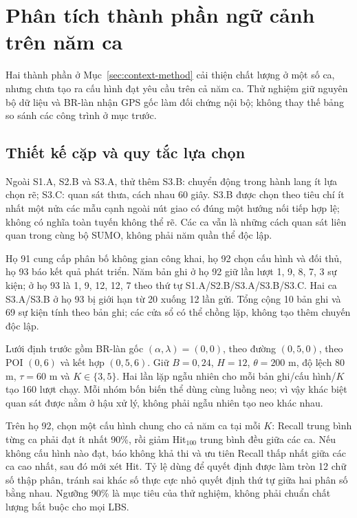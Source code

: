 \section{Phân tích thành phần ngữ cảnh trên năm ca}
\label{sec:context-study}

Hai thành phần ở Mục~\ref{sec:context-method} cải thiện chất lượng ở một số ca, nhưng chưa tạo ra cấu hình đạt yêu cầu trên cả năm ca. Thử nghiệm giữ nguyên bộ dữ liệu và BR-làn nhận GPS gốc làm đối chứng nội bộ; không thay thế bảng so sánh các công trình ở mục trước.

\subsection{Thiết kế cặp và quy tắc lựa chọn}

Ngoài S1.A, S2.B và S3.A, thử thêm S3.B: chuyển động trong hành lang ít lựa chọn rẽ; S3.C: quan sát thưa, cách nhau 60 giây. S3.B được chọn theo tiêu chí ít nhất một nửa các mẫu cạnh ngoài nút giao có đúng một hướng nối tiếp hợp lệ; không có nghĩa toàn tuyến không thể rẽ. Các ca vẫn là những cách quan sát liên quan trong cùng bộ SUMO, không phải năm quần thể độc lập.

Họ 91 cung cấp phân bố không gian công khai, họ 92 chọn cấu hình và đối thủ, họ 93 báo kết quả phát triển. Năm bản ghi ở họ 92 giữ lần lượt 1, 9, 8, 7, 3 sự kiện; ở họ 93 là 1, 9, 12, 12, 7 theo thứ tự S1.A/S2.B/S3.A/S3.B/S3.C. Hai ca S3.A/S3.B ở họ 93 bị giới hạn từ 20 xuống 12 lần gửi. Tổng cộng 10 bản ghi và 69 sự kiện tính theo bản ghi; các cửa sổ có thể chồng lặp, không tạo thêm chuyến độc lập.

Lưới định trước gồm BR-làn gốc $(\alpha,\lambda)=(0,0)$, theo đường $(0{,}5,0)$, theo POI $(0,6)$ và kết hợp $(0{,}5,6)$. Giữ $B=0{,}24$, $H=12$, $\theta=200$ m, độ lệch 80 m, $\tau=60$ m và $K\in\{3,5\}$. Hai lần lặp ngẫu nhiên cho mỗi bản ghi/cấu hình/$K$ tạo 160 lượt chạy. Mỗi nhóm bốn biến thể dùng cùng luồng neo; vì vậy khác biệt quan sát được nằm ở hậu xử lý, không phải ngẫu nhiên tạo neo khác nhau.

Trên họ 92, chọn một cấu hình chung cho cả năm ca tại mỗi $K$: Recall trung bình từng ca phải đạt ít nhất 90\%, rồi giảm Hit$_{100}$ trung bình đều giữa các ca. Nếu không cấu hình nào đạt, báo không khả thi và ưu tiên Recall thấp nhất giữa các ca cao nhất, sau đó mới xét Hit. Tỷ lệ dùng để quyết định được làm tròn 12 chữ số thập phân, tránh sai khác số thực cực nhỏ quyết định thứ tự giữa hai phân số bằng nhau. Ngưỡng 90\% là mục tiêu của thử nghiệm, không phải chuẩn chất lượng bắt buộc cho mọi LBS.

